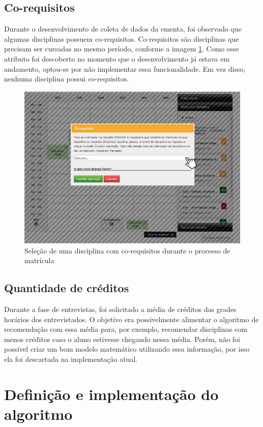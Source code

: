 \subsection{Co-requisitos}
Durante o desenvolvimento de coleta de dados da ementa, foi observado que algumas disciplinas possuem co-requisitos. Co-requisitos são disciplinas que precisam ser cursadas no mesmo período, conforme a imagem \ref{fig:corequisito}. Como esse atributo foi descoberto no momento que o desenvolvimento já estava em andamento, optou-se por não implementar essa funcionalidade. Em vez disso, nenhuma disciplina possui co-requisitos.

\begin{figure}[ht]
    \begin{center}
    \includegraphics[width=350pt]{figuras/corequisitos.png}
    \caption{Seleção de uma disciplina com co-requisitos durante o processo de matrícula}
    \label{fig:corequisito}
    \end{center}
\end{figure}

\subsection{Quantidade de créditos}
Durante a fase de entrevistas, foi solicitado a média de créditos das grades horários dos entrevistados. O objetivo era possivelmente alimentar o algoritmo de recomendação com essa média para, por exemplo, recomendar disciplinas com menos créditos caso o aluno estivesse chegando nessa média. Porém, não foi possível criar um bom modelo matemático utilizando essa informação, por isso ela foi descartada na implementação atual.


\section{Definição e implementação do algoritmo}
\label{sec:Definição e implementação do algoritmo}

